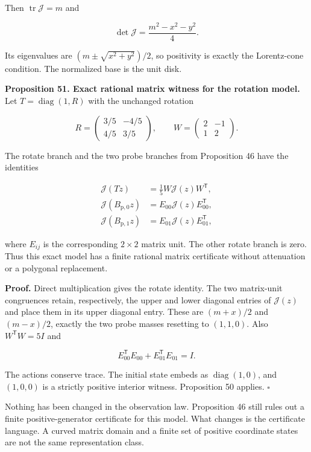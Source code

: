 \documentclass[11pt,letterpaper]{article}
\begin{document}
Then \(\operatorname{tr}\mathcal J=m\) and

\[
\det\mathcal J=\frac{m^2-x^2-y^2}{4}.
\]

Its eigenvalues are \((m\pm\sqrt{x^2+y^2})/2\), so positivity is exactly
the Lorentz-cone condition. The normalized base is the unit disk.

\textbf{Proposition 51. Exact rational matrix witness for the rotation
model.} Let \(T=\operatorname{diag}(1,R)\) with the unchanged rotation

\[
R=\begin{pmatrix}3/5&-4/5\\4/5&3/5\end{pmatrix},
\qquad W=\begin{pmatrix}2&-1\\1&2\end{pmatrix}.
\]

The rotate branch and the two probe branches from Proposition 46 have
the identities

\[
\begin{aligned}
\mathcal J(Tz)&=\frac15W\mathcal J(z)W^{\mathsf T},\\
\mathcal J(B_{\mathrm p,0}z)&=E_{00}\mathcal J(z)E_{00}^{\mathsf T},\\
\mathcal J(B_{\mathrm p,1}z)&=E_{01}\mathcal J(z)E_{01}^{\mathsf T},
\end{aligned}
\]

where \(E_{ij}\) is the corresponding \(2\times2\) matrix unit. The
other rotate branch is zero. Thus this exact model has a finite rational
matrix certificate without attenuation or a polygonal replacement.

\textbf{Proof.} Direct multiplication gives the rotate identity. The two
matrix-unit congruences retain, respectively, the upper and lower
diagonal entries of \(\mathcal J(z)\) and place them in its upper
diagonal entry. These are \((m+x)/2\) and \((m-x)/2\), exactly the two
probe masses resetting to \((1,1,0)\). Also \(W^{\mathsf T}W=5I\) and

\[
E_{00}^{\mathsf T}E_{00}+E_{01}^{\mathsf T}E_{01}=I.
\]

The actions conserve trace. The initial state embeds as
\(\operatorname{diag}(1,0)\), and \((1,0,0)\) is a strictly positive
interior witness. Proposition 50 applies. \(\square\)

Nothing has been changed in the observation law. Proposition 46 still
rules out a finite positive-generator certificate for this model. What
changes is the certificate language. A curved matrix domain and a finite
set of positive coordinate states are not the same representation class.
\end{document}
